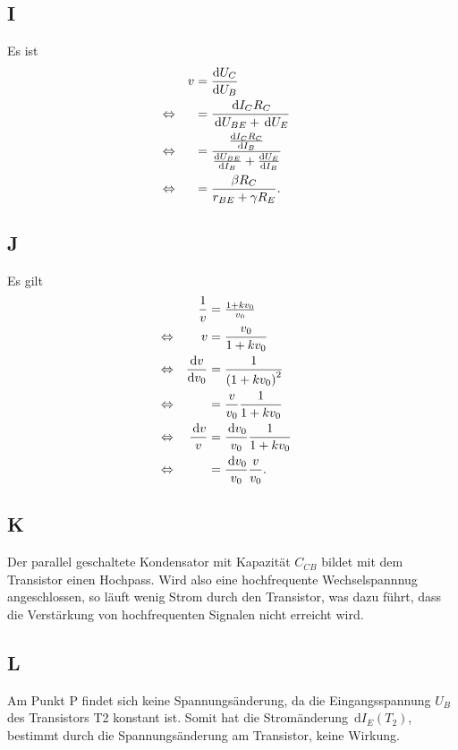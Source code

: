 \documentclass[a4paper,12pt]{article}
\newcommand{\td}{\,\text{d}}
\numberwithin{equation}{section}
\begin{document}
\subsection{I}
Es ist
\begin{align} 
        && v &= \diff[]{U_C}{U_B} &&\\
        \Leftrightarrow && &= \dfrac{\td I_CR_C}{\td U_{BE}+\td U_E} &&\nonumber \\
        \Leftrightarrow && &= \dfrac{\diff[]{I_CR_C}{I_B}}{\diff[]{U_{BE}}{I_B}+\diff[]{U_E}{I_B}} &&\nonumber \\
        \Leftrightarrow && &= \dfrac{\beta R_C}{r_{BE}+\gamma R_E}. &&
\end{align} 

\subsection{J}
Es gilt
\begin{align} 
        && \dfrac{1}{v} &= \tfrac{1+kv_0}{v_0} && \\
        \Leftrightarrow && v &= \dfrac{v_0}{1+kv_0} &&\nonumber \\
        \Leftrightarrow && \diff[]{v}{v_0} &= \dfrac{1}{\left(1+kv_0\right)^2} &&\nonumber \\
        \Leftrightarrow && &= \dfrac{v}{v_0}\dfrac{1}{1+kv_0} &&\nonumber \\
        \Leftrightarrow && \dfrac{\td v}{v} &= \dfrac{\td v_0}{v_0}\dfrac{1}{1+kv_0}&&\nonumber \\
        \Leftrightarrow && &= \dfrac{\td v_0}{v_0}\dfrac{v}{v_0}. &&
\end{align} 

\subsection{K}
Der parallel geschaltete Kondensator mit Kapazität $C_{CB}$ bildet mit dem Transistor einen Hochpass.
Wird also eine hochfrequente Wechselspannnug angeschlossen, so läuft wenig Strom durch den Transistor, was dazu führt, dass die Verstärkung von hochfrequenten Signalen nicht erreicht wird.

\subsection{L}
Am Punkt P findet sich keine Spannungsänderung, da die Eingangsspannung $U_B$ des Transistors T2 konstant ist.
Somit hat die Stromänderung $\td I_E\left(T_2\right)$, bestimmt durch die Spannungsänderung am Transistor, keine Wirkung.
\end{document}
